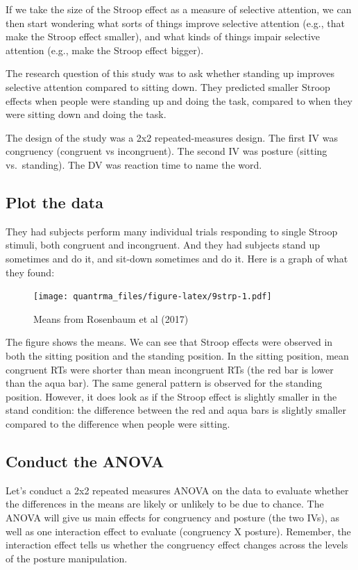 \documentclass[
]{book}
\begin{document}
If we take the size of the Stroop effect as a measure of selective attention, we can then start wondering what sorts of things improve selective attention (e.g., that make the Stroop effect smaller), and what kinds of things impair selective attention (e.g., make the Stroop effect bigger).

The research question of this study was to ask whether standing up improves selective attention compared to sitting down. They predicted smaller Stroop effects when people were standing up and doing the task, compared to when they were sitting down and doing the task.

The design of the study was a 2x2 repeated-measures design. The first IV was congruency (congruent vs incongruent). The second IV was posture (sitting vs.~standing). The DV was reaction time to name the word.

\hypertarget{plot-the-data}{%
\subsection{Plot the data}\label{plot-the-data}}

They had subjects perform many individual trials responding to single Stroop stimuli, both congruent and incongruent. And they had subjects stand up sometimes and do it, and sit-down sometimes and do it. Here is a graph of what they found:

\begin{figure}
\centering
\texttt{[image: quantrma\_files/figure-latex/9strp-1.pdf]}
\caption{\label{fig:9strp}Means from Rosenbaum et al (2017)}
\end{figure}

The figure shows the means. We can see that Stroop effects were observed in both the sitting position and the standing position. In the sitting position, mean congruent RTs were shorter than mean incongruent RTs (the red bar is lower than the aqua bar). The same general pattern is observed for the standing position. However, it does look as if the Stroop effect is slightly smaller in the stand condition: the difference between the red and aqua bars is slightly smaller compared to the difference when people were sitting.

\hypertarget{conduct-the-anova}{%
\subsection{Conduct the ANOVA}\label{conduct-the-anova}}

Let's conduct a 2x2 repeated measures ANOVA on the data to evaluate whether the differences in the means are likely or unlikely to be due to chance. The ANOVA will give us main effects for congruency and posture (the two IVs), as well as one interaction effect to evaluate (congruency X posture). Remember, the interaction effect tells us whether the congruency effect changes across the levels of the posture manipulation.
\end{document}
